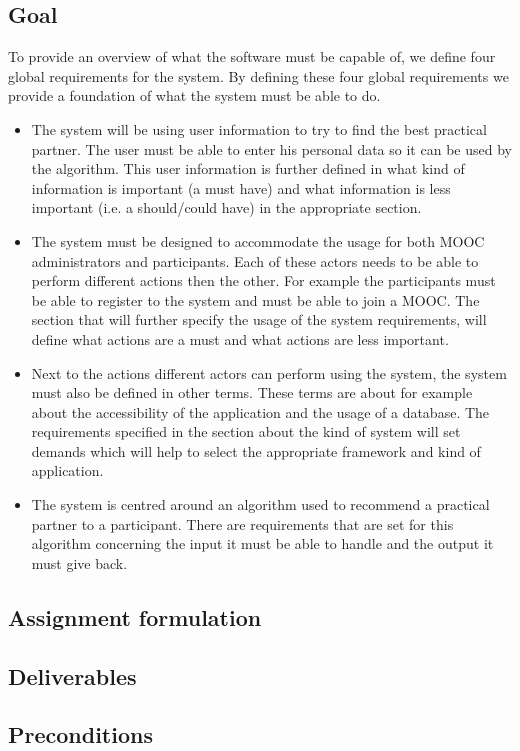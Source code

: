 \documentclass[]{article}
\begin{document}
\subsection{Goal}
To provide an overview of what the software must be capable of, we define four global requirements for the system.
By defining these four global requirements we provide a foundation of what the system must be able to do.
\begin{itemize}
\item The system will be using user information to try to find the best practical partner.
The user must be able to enter his personal data so it can be used by the algorithm.
This user information is further defined in what kind of information is important (a must have) and what information is less important (i.e. a should/could have) in the appropriate section.
\item The system must be designed to accommodate the usage for both MOOC administrators and participants.
Each of these actors needs to be able to perform different actions then the other.
For example the participants must be able to register to the system and must be able to join a MOOC.
The section that will further specify the usage of the system requirements, will define what actions are a must and what actions are less important.
\item Next to the actions different actors can perform using the system, the system must also be defined in other terms.
These terms are about for example about the accessibility of the application and the usage of a database.
The requirements specified in the section about the kind of system will set demands which will help to select the appropriate framework and kind of application.
\item The system is centred around an algorithm used to recommend a practical partner to a participant.
There are requirements that are set for this algorithm concerning the input it must be able to handle and the output it must give back.
\end{itemize}

\subsection{Assignment formulation}
\subsection{Deliverables}
\subsection{Preconditions}
\end{document}
